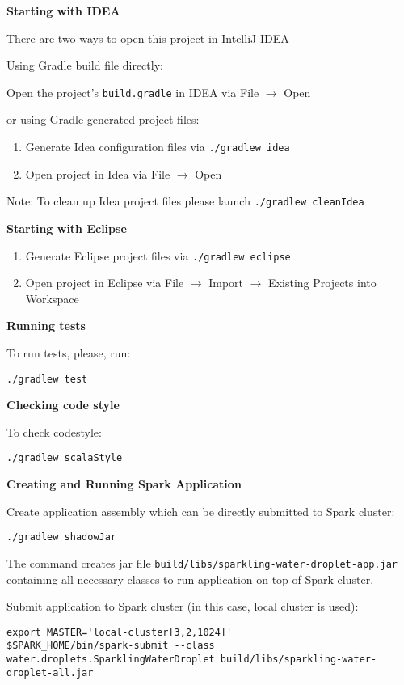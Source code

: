 \textbf{Starting with IDEA}

There are two ways to open this project in IntelliJ IDEA

Using Gradle build file directly:

\quad Open the project's \texttt{build.gradle} in IDEA via File $\rightarrow$ Open

or using Gradle generated project files:

\begin{enumerate}
\item Generate Idea configuration files via  {\lstinline[style=Bash]|./gradlew idea|} 
\item Open project in Idea via File $\rightarrow$ Open
\end{enumerate}

Note: To clean up Idea project files please launch {\lstinline[style=Bash]|./gradlew cleanIdea|} 

\textbf{Starting with Eclipse}

\begin{enumerate}
\item Generate Eclipse project files via {\lstinline[style=Bash]|./gradlew eclipse|} 
\item Open project in Eclipse via File $\rightarrow$ Import $\rightarrow$ Existing Projects into Workspace
\end{enumerate}

\textbf{Running tests}

To run tests, please, run:

\begin{lstlisting}[style=Bash]
./gradlew test
\end{lstlisting}

\textbf{Checking code style}

To check codestyle:

\begin{lstlisting}[style=Bash]
./gradlew scalaStyle
\end{lstlisting}

\textbf{Creating and Running Spark Application}

Create application assembly which can be directly submitted to Spark cluster:

\begin{lstlisting}[style=Bash]
./gradlew shadowJar
\end{lstlisting}

The command creates jar file \texttt{build/libs/sparkling-water-droplet-app.jar} containing all necessary classes to run application on top of Spark cluster.

Submit application to Spark cluster (in this case, local cluster is used):

\begin{lstlisting}[style=Bash]
export MASTER='local-cluster[3,2,1024]'
$SPARK_HOME/bin/spark-submit --class water.droplets.SparklingWaterDroplet build/libs/sparkling-water-droplet-all.jar
\end{lstlisting}


